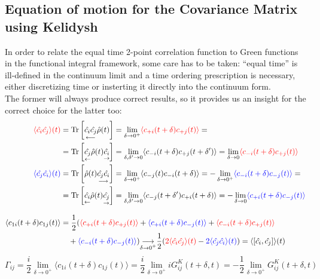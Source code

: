 \documentclass[a4paper,11pt]{article}
\DeclareMathOperator{\Tr}{Tr}
\theoremstyle{remark}
\newcommand{\mean}[1]{\ensuremath{\langle #1 \rangle}}
\newcommand*{\mathcolor}{}  %
\def\mathcolor#1#{\mathcoloraux{#1}}
\newcommand*{\mathcoloraux}[3]{%
  \protect\leavevmode
  \begingroup
    \color#1{#2}#3%
  \endgroup
}
\begin{document}
  \subsection{Equation of motion for the Covariance Matrix using Kelidysh}
  In order to relate the equal time 2-point correlation function to Green functions in the functional integral framework, some care has to be taken: ``equal time'' is ill-defined in the continuum limit and a time ordering prescription is necessary, either discretizing time or insterting it directly into the continuum form. \\ The former will always produce correct results, so it provides us an insight for the correct choice for the latter too:
  \begin{align*}
  \mathcolor{red}{\mean{\hat{c_i}\hat{c_j}}(t)}&=\Tr\left[ \underset{\mathclap{\longleftarrow}}{\hat{c_i}\hat{c_j}}\hat{\rho}(t)\right] = \lim_{\delta\to 0^+}\mathcolor{red}{\mean{c_{+i}(t+\delta)c_{+j}(t)}}=\notag\\ 
  &=\Tr\left[ \underset{\mathclap{\leftarrow}}{\hat{c_j}}\hat{\rho}(t)\underset{\mathclap{\rightarrow}}{\hat{c_i}}\right] = \lim_{\delta,\delta'\to 0} \mean{c_{-i}(t+\delta)c_{+j}(t+\delta')} = \lim_{\delta\to 0} \mathcolor{red}{\mean{c_{-i}(t+\delta)c_{+j}(t)}}  \notag\\
  \mathcolor{blue}{\mean{\hat{c_j}\hat{c_i}}(t)}&=\Tr\left[\hat{\rho}(t) \underset{\mathclap{\longrightarrow}}{\hat{c_j}\hat{c_i}}\right] = \lim_{\delta\to 0^+}\mean{c_{-j}(t)c_{-i}(t+\delta)}=-\lim_{\delta\to 0^+}\mathcolor{blue}{\mean{c_{-i}(t+\delta)c_{-j}(t)}}=\notag\\
   &=\Tr\left[ \underset{\mathclap{\leftarrow}}{\hat{c_i}}\hat{\rho}(t)\underset{\mathclap{\rightarrow}}{\hat{c_j}}\right]= \lim_{\delta,\delta'\to 0} \mean{c_{-j}(t+\delta')c_{+i}(t+\delta)}=-\lim_{\delta\to 0} \mathcolor{blue}{\mean{c_{+i}(t+\delta)c_{-j}(t)}} \notag\\[0.3cm]
  \mean{c_{1i}(t+\delta)c_{1j}(t)} &= \frac{1}{2}(\mathcolor{red}{\mean{c_{+i}(t+\delta)c_{+j}(t)}}+\mathcolor{blue}{\mean{c_{+i}(t+\delta)c_{-j}(t)}}+\mathcolor{red}{\mean{c_{-i}(t+\delta)c_{+j}(t)}}\notag \\ & \quad +\mathcolor{blue}{\mean{c_{-i}(t+\delta)c_{-j}(t)}})\underset{\mathclap{\delta\to0^+}}{\longrightarrow}\frac{1}{2}(\mathcolor{red}{2\mean{\hat{c_i}\hat{c_j}}(t)}-\mathcolor{blue}{2\mean{\hat{c_j}\hat{c_i}}(t)})=\mean{\left[\hat{c_i},\hat{c_j}\right]}(t)\notag\\
  \end{align*}
  \begin{equation}
  \Gamma_{ij}=\frac{i}{2}\lim_{\delta\to0^+}\mean{c_{1i}(t+\delta)c_{1j}(t)}=\frac{i}{2}\lim_{\delta\to0^+}iG^K_{ij}(t+\delta,t)=-\frac{1}{2}\lim_{\delta\to0^+}G^K_{ij}(t+\delta,t)
  \end{equation}
\end{document}
